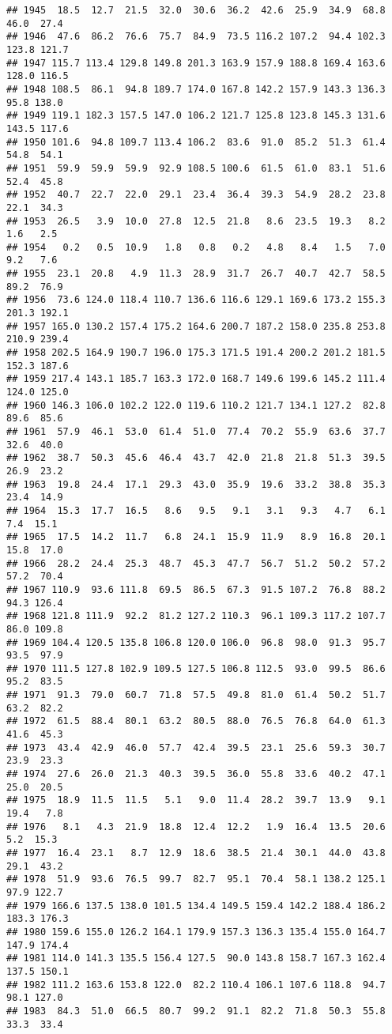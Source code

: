 \documentclass[
]{article}
\begin{document}
\begin{verbatim}
## 1945  18.5  12.7  21.5  32.0  30.6  36.2  42.6  25.9  34.9  68.8  46.0  27.4
## 1946  47.6  86.2  76.6  75.7  84.9  73.5 116.2 107.2  94.4 102.3 123.8 121.7
## 1947 115.7 113.4 129.8 149.8 201.3 163.9 157.9 188.8 169.4 163.6 128.0 116.5
## 1948 108.5  86.1  94.8 189.7 174.0 167.8 142.2 157.9 143.3 136.3  95.8 138.0
## 1949 119.1 182.3 157.5 147.0 106.2 121.7 125.8 123.8 145.3 131.6 143.5 117.6
## 1950 101.6  94.8 109.7 113.4 106.2  83.6  91.0  85.2  51.3  61.4  54.8  54.1
## 1951  59.9  59.9  59.9  92.9 108.5 100.6  61.5  61.0  83.1  51.6  52.4  45.8
## 1952  40.7  22.7  22.0  29.1  23.4  36.4  39.3  54.9  28.2  23.8  22.1  34.3
## 1953  26.5   3.9  10.0  27.8  12.5  21.8   8.6  23.5  19.3   8.2   1.6   2.5
## 1954   0.2   0.5  10.9   1.8   0.8   0.2   4.8   8.4   1.5   7.0   9.2   7.6
## 1955  23.1  20.8   4.9  11.3  28.9  31.7  26.7  40.7  42.7  58.5  89.2  76.9
## 1956  73.6 124.0 118.4 110.7 136.6 116.6 129.1 169.6 173.2 155.3 201.3 192.1
## 1957 165.0 130.2 157.4 175.2 164.6 200.7 187.2 158.0 235.8 253.8 210.9 239.4
## 1958 202.5 164.9 190.7 196.0 175.3 171.5 191.4 200.2 201.2 181.5 152.3 187.6
## 1959 217.4 143.1 185.7 163.3 172.0 168.7 149.6 199.6 145.2 111.4 124.0 125.0
## 1960 146.3 106.0 102.2 122.0 119.6 110.2 121.7 134.1 127.2  82.8  89.6  85.6
## 1961  57.9  46.1  53.0  61.4  51.0  77.4  70.2  55.9  63.6  37.7  32.6  40.0
## 1962  38.7  50.3  45.6  46.4  43.7  42.0  21.8  21.8  51.3  39.5  26.9  23.2
## 1963  19.8  24.4  17.1  29.3  43.0  35.9  19.6  33.2  38.8  35.3  23.4  14.9
## 1964  15.3  17.7  16.5   8.6   9.5   9.1   3.1   9.3   4.7   6.1   7.4  15.1
## 1965  17.5  14.2  11.7   6.8  24.1  15.9  11.9   8.9  16.8  20.1  15.8  17.0
## 1966  28.2  24.4  25.3  48.7  45.3  47.7  56.7  51.2  50.2  57.2  57.2  70.4
## 1967 110.9  93.6 111.8  69.5  86.5  67.3  91.5 107.2  76.8  88.2  94.3 126.4
## 1968 121.8 111.9  92.2  81.2 127.2 110.3  96.1 109.3 117.2 107.7  86.0 109.8
## 1969 104.4 120.5 135.8 106.8 120.0 106.0  96.8  98.0  91.3  95.7  93.5  97.9
## 1970 111.5 127.8 102.9 109.5 127.5 106.8 112.5  93.0  99.5  86.6  95.2  83.5
## 1971  91.3  79.0  60.7  71.8  57.5  49.8  81.0  61.4  50.2  51.7  63.2  82.2
## 1972  61.5  88.4  80.1  63.2  80.5  88.0  76.5  76.8  64.0  61.3  41.6  45.3
## 1973  43.4  42.9  46.0  57.7  42.4  39.5  23.1  25.6  59.3  30.7  23.9  23.3
## 1974  27.6  26.0  21.3  40.3  39.5  36.0  55.8  33.6  40.2  47.1  25.0  20.5
## 1975  18.9  11.5  11.5   5.1   9.0  11.4  28.2  39.7  13.9   9.1  19.4   7.8
## 1976   8.1   4.3  21.9  18.8  12.4  12.2   1.9  16.4  13.5  20.6   5.2  15.3
## 1977  16.4  23.1   8.7  12.9  18.6  38.5  21.4  30.1  44.0  43.8  29.1  43.2
## 1978  51.9  93.6  76.5  99.7  82.7  95.1  70.4  58.1 138.2 125.1  97.9 122.7
## 1979 166.6 137.5 138.0 101.5 134.4 149.5 159.4 142.2 188.4 186.2 183.3 176.3
## 1980 159.6 155.0 126.2 164.1 179.9 157.3 136.3 135.4 155.0 164.7 147.9 174.4
## 1981 114.0 141.3 135.5 156.4 127.5  90.0 143.8 158.7 167.3 162.4 137.5 150.1
## 1982 111.2 163.6 153.8 122.0  82.2 110.4 106.1 107.6 118.8  94.7  98.1 127.0
## 1983  84.3  51.0  66.5  80.7  99.2  91.1  82.2  71.8  50.3  55.8  33.3  33.4
\end{verbatim}
\end{document}
